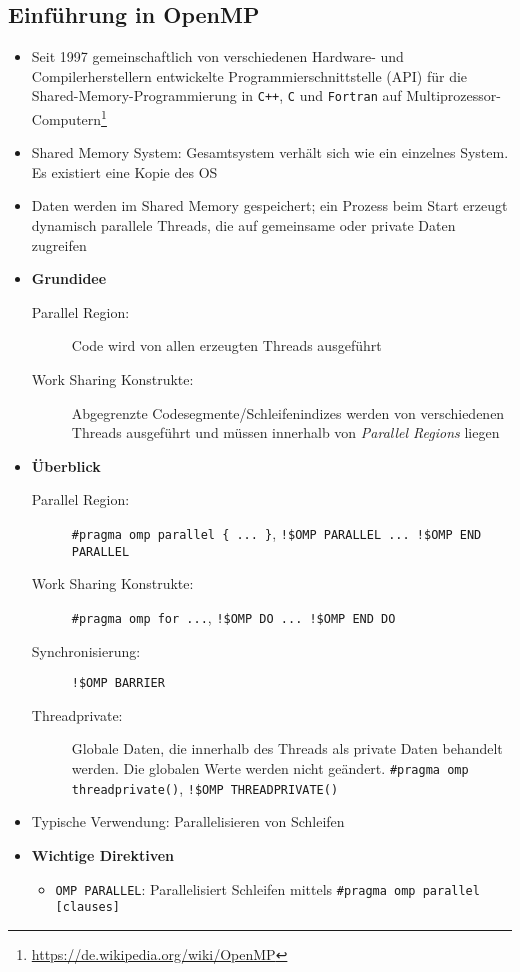 \subsection{Einführung in OpenMP}
\begin{itemize}
	\item Seit 1997 gemeinschaftlich von verschiedenen Hardware- und Compilerherstellern entwickelte Programmierschnittstelle (API) für die Shared-Memory-Programmierung in \texttt{C++}, \texttt{C} und \texttt{Fortran} auf Multiprozessor-Computern\footnote{\url{https://de.wikipedia.org/wiki/OpenMP}}
	\item Shared Memory System: Gesamtsystem verhält sich wie ein einzelnes System. Es existiert eine Kopie des OS 
	\item Daten werden im Shared Memory gespeichert; ein Prozess beim Start erzeugt dynamisch parallele Threads, die auf gemeinsame oder private Daten zugreifen
	\item \textbf{Grundidee}
	\begin{description}
		\item[Parallel Region:] Code wird von allen erzeugten Threads ausgeführt
		\item[Work Sharing Konstrukte:] Abgegrenzte Codesegmente/Schleifenindizes werden von verschiedenen Threads ausgeführt und müssen innerhalb von \textit{Parallel Regions} liegen
	\end{description}
	\item \textbf{Überblick}
	\begin{description}
		\item[Parallel Region:] \texttt{\#pragma omp parallel \{ ... \}}, \texttt{!\$OMP PARALLEL ... !\$OMP END PARALLEL}
		\item[Work Sharing Konstrukte:] \texttt{\#pragma omp for ...}, \texttt{!\$OMP DO ... !\$OMP END DO}
		\item[Synchronisierung:] \texttt{!\$OMP BARRIER} %
		\item[Threadprivate:] Globale Daten, die innerhalb des Threads als private Daten behandelt werden. Die globalen Werte werden nicht geändert. \texttt{\#pragma omp threadprivate()}, \texttt{!\$OMP THREADPRIVATE()}
	\end{description}
	\item Typische Verwendung: Parallelisieren von Schleifen
	\item \textbf{Wichtige Direktiven}
	\begin{itemize}
		\item \texttt{OMP PARALLEL}: Parallelisiert Schleifen mittels \texttt{\#pragma omp parallel [clauses]}

\end{itemize}
\end{itemize}
